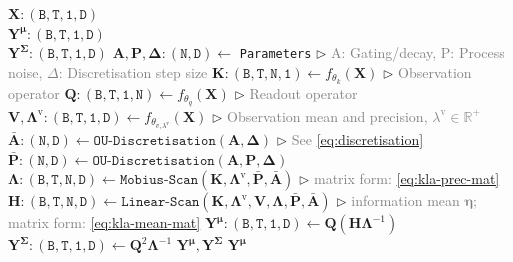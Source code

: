 \documentclass{article}
\newcommand{\shape}[1]{\hfill $\triangleright$ \small{\textcolor{gray}{#1}}}
\begin{document}
\begin{algorithm}[tb]
   \caption{Kalman Linear Attention}
   \label{alg:kla}
\begin{algorithmic}[1]
     $\mathbf{X} : (\mathtt{B, T, 1, D})$\\
    $ \mathbf{Y^\mu} : (\mathtt{B, T, 1, D}) $ \\
    $ \mathbf{Y^\Sigma} : (\mathtt{B, T, 1, D}) $
   \STATE $\mathbf{A, P, \Delta} : (\mathtt{N, D}) \gets$ \texttt{Parameters} \shape{A: Gating/decay, P: Process noise, $\Delta$: Discretisation step size}
   \STATE $\mathbf{K} : (\mathtt{B, T, N, 1}) \gets f_{\theta_{k}}(\mathbf{X})$ \shape{Observation operator}
   \STATE $\mathbf{Q} : (\mathtt{B, T, 1, N}) \gets f_{\theta_{q}}(\mathbf{X})$ \shape{Readout operator}
   \STATE $\mathbf{V, \Lambda^{\mathrm{v}}} : (\mathtt{B, T, 1, D}) \gets f_{\theta_{v,\lambda^{\mathrm{v}}}}(\mathbf{X})$ \shape{Observation mean and precision, $\lambda^{\mathrm{v}} \in \mathbb{R}^{+}$}
   \STATE $\mathbf{\bar A} : (\mathtt{N, D}) \gets \texttt{OU-Discretisation}(\mathbf{A, \Delta})$ \shape{See \cref{eq:discretisation}}
   \STATE $\mathbf{\bar P} : (\mathtt{N, D}) \gets \texttt{OU-Discretisation}(\mathbf{A, P, \Delta})$
   \STATE $\mathbf{\Lambda} : (\mathtt{B, T, N, D}) \gets \texttt{Mobius-Scan}(\mathbf{K, \Lambda^{\mathrm{v}}, \bar P, \bar A})$ \shape{matrix form: \cref{eq:kla-prec-mat}}
   \STATE $\mathbf{H} : (\mathtt{B, T, N, D}) \gets \texttt{Linear-Scan}(\mathbf{K, \Lambda^{\mathrm{v}}, V, \Lambda, \bar P, \bar A})$       \shape{information mean $\boldsymbol{\eta}$; matrix form: \cref{eq:kla-mean-mat}}
   \STATE $\mathbf{Y^\mu} : (\mathtt{B, T, 1, D}) \gets \mathbf{Q} (\mathbf{H} \mathbf{\Lambda}^{-1}) $
   \STATE $\mathbf{Y^\Sigma} : (\mathtt{B, T, 1, D}) \gets \mathbf{Q}^2 \mathbf{\Lambda}^{-1} $
    $\mathbf{Y^\mu}, \mathbf{Y^\Sigma}$
   \ELSE
    $\mathbf{Y^\mu}$
   \ENDIF
\end{algorithmic}
\end{algorithm}
\end{document}
